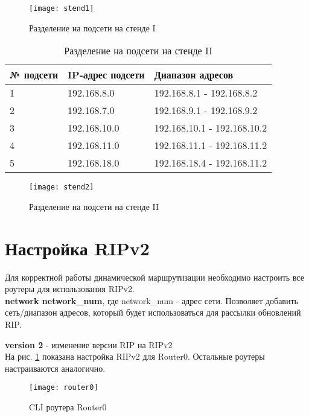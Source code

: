 \documentclass[a4paper, 14pt]{article}
\begin{document}
\begin{figure}[H]
    \texttt{[image: stend1]}
    \caption{Разделение на подсети на стенде I}
\end{figure}

\newpage
\begin{table}[H]
    \centering
    \caption{Разделение на подсети на стенде II}
    \begin{tabular}{|p{0.8cm}|p{3cm}|p{6cm}|}
        \hline
        № подсети & IP-адрес подсети & Диапазон адресов  \\
        \hline
        1 & 192.168.8.0 & 192.168.8.1 - 192.168.8.2  \\
        \hline
        2 & 192.168.7.0 & 192.168.9.1 - 192.168.9.2  \\
        \hline
        3 & 192.168.10.0 & 192.168.10.1 - 192.168.10.2  \\
        \hline
        4 & 192.168.11.0 & 192.168.11.1 - 192.168.11.2 \\
        \hline
        5 & 192.168.18.0 & 192.168.18.4 - 192.168.11.2 \\
        \hline
    \end{tabular}
\end{table}

\begin{figure}[H]
    \texttt{[image: stend2]}
    \caption{Разделение на подсети на стенде II}
\end{figure}


\newpage
\section*{Настройка RIPv2}

Для корректной работы динамической маршрутизации необходимо настроить все роутеры для использования RIPv2.\\

\textbf{network network\_num}, где network\_num - адрес сети. Позволяет добавить сеть/диапазон адресов, который будет использоваться для рассылки обновлений RIP.

\textbf{version 2} - изменение версии RIP на RIPv2\\


На рис. \ref{fig:1} показана настройка RIPv2 для Router0. Остальные роутеры настраиваются аналогично.

\begin{figure}[H]
	\begin{center} 
    \texttt{[image: router0]}
    \caption{CLI роутера Router0}
    \label{fig:1}
    \end{center}
\end{figure}
\end{document}
